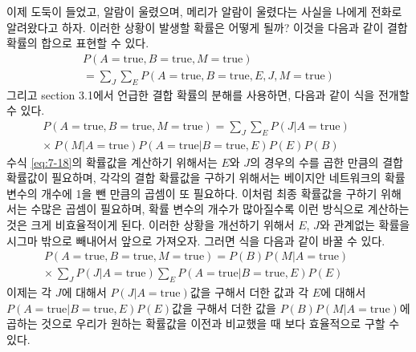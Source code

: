 \documentclass[a4paper]{oblivoir}
\begin{document}
이제 도둑이 들었고, 알람이 울렸으며, 메리가 알람이 울렸다는 사실을 나에게 전화로 알려왔다고 하자. 이러한 상황이 발생할 확률은 어떻게 될까? 이것을 다음과 같이 결합 확률의 합으로 표현할 수 있다. 
\begin{eqnarray}
P(A=\textrm{true}, B=\textrm{true}, M=\textrm{true}) \ \ \ \ \ \ \ \ \ \ \ \ \ \ \ \ \ \ \ \ \ \ \ \ \  \nonumber  \\
= \sum_{J} \sum_{E} P(A=\textrm{true},B=\textrm{true},E,J,M=\textrm{true}) \label{eq:7-17-1}
\end{eqnarray}
그리고 section 3.1에서 언급한 결합 확률의 분해를 사용하면, 다음과 같이 식을 전개할 수 있다. 
\begin{eqnarray}
P(A=\textrm{true}, B=\textrm{true}, M=\textrm{true}) = \sum_{J} \sum_{E} P(J|A=\textrm{true}) \ \ \ \ \ \  \ \ \ \ \nonumber  \\
\times \ P(M|A=\textrm{true}) P(A=\textrm{true}|B=\textrm{true},E) P(E) P(B)   \label{eq:7-18} 
\end{eqnarray}
수식 \ref{eq:7-18}의 확률값을 계산하기 위해서는 $E$와 $J$의 경우의 수를 곱한 만큼의 결합 확률값이 필요하며, 각각의 결합 확률값을 구하기 위해서는 베이지안 네트워크의 확률 변수의 개수에 1을 뺀 만큼의 곱셈이 또 필요하다. 이처럼 최종 확률값을 구하기 위해서는 수많은 곱셈이 필요하며, 확률 변수의 개수가 많아질수록 이런 방식으로 계산하는 것은 크게 비효율적이게 된다. 이러한 상황을 개선하기 위해서 $E$, $J$와 관계없는 확률을 시그마 밖으로 빼내어서 앞으로 가져오자. 그러면 식을 다음과 같이 바꿀 수 있다. 
\begin{eqnarray}
P(A=\textrm{true}, B=\textrm{true}, M=\textrm{true}) = P(B) P(M|A=\textrm{true})  \ \ \ \ \ \  \ \ \ \ \nonumber  \\
 \times \  \sum_{J} P(J|A=\textrm{true}) \sum_{E} P(A=\textrm{true}|B=\textrm{true},E) P(E) \label{eq:7-19} 
\end{eqnarray}
이제는 각 $J$에 대해서 $P(J|A=\textrm{true})$값을 구해서 더한 값과 각 $E$에 대해서 $P(A=\textrm{true}|B=\textrm{true},E)P(E)$값을 구해서 더한 값을 $P(B) P(M|A=\textrm{true})$에 곱하는 것으로 우리가 원하는 확률값을 이전과 비교했을 때 보다 효율적으로 구할 수 있다. \\
\end{document}
